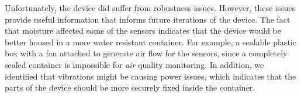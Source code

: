 \documentclass[11pt,twosided,a4paper]{report}
\begin{document}
Unfortunately, the device did suffer from robustness issues. However, these issues provide useful information that informs future iterations of the device. The fact that moisture affected some of the sensors indicates that the device would be better housed in a more water resistant container. For example, a sealable plastic box with a fan attached to generate air flow for the sensors, since a completely sealed container is impossible for \textit{air} quality monitoring. In addition, we identified that vibrations might be causing power issues, which indicates that the parts of the device should be more securely fixed inside the container.



%
%
%
%
%
%
%
\end{document}
